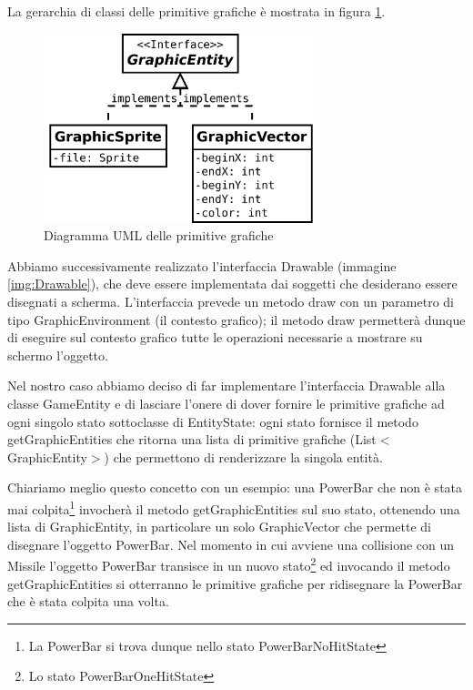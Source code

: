 \documentclass[a4paper,12pt]{article}
\begin{document}
La gerarchia di classi delle primitive grafiche \`e mostrata in figura \ref{img:GraphicEntity}.

\begin{figure}[h]
\centering
\includegraphics[width=8cm]{GraphicEntity.pdf}
\caption{Diagramma UML delle primitive grafiche}
\label{img:GraphicEntity}
\end{figure}

Abbiamo successivamente realizzato l'interfaccia \textsf{Drawable} (immagine \ref{img:Drawable}), che deve essere implementata dai soggetti che desiderano essere disegnati a scherma. L'interfaccia prevede un metodo \textsf{draw} con  un parametro di tipo \textsf{GraphicEnvironment} (il contesto grafico); il metodo \textsf{draw} permetter\`a dunque di eseguire sul contesto grafico tutte le operazioni necessarie a mostrare su schermo l'oggetto.

Nel nostro caso abbiamo deciso di far implementare l'interfaccia \textsf{Drawable} alla classe \textsf{GameEntity} e di lasciare l'onere di dover fornire le primitive grafiche ad ogni singolo stato sottoclasse di \textsf{EntityState}: ogni stato fornisce il metodo \textsf{getGraphicEntities} che ritorna una lista di primitive grafiche (\textsf{List}$<$\textsf{GraphicEntity}$>$) che permettono di renderizzare la singola entit\`a.

Chiariamo meglio questo concetto con un esempio: una \textsf{PowerBar} che non \`e stata mai colpita\footnote{La \textsf{PowerBar} si trova dunque nello stato \textsf{PowerBarNoHitState}} invocher\`a il metodo \textsf{getGraphicEntities} sul suo stato, ottenendo una lista di \textsf{GraphicEntity}, in particolare un solo \textsf{GraphicVector} che permette di disegnare l'oggetto \textsf{PowerBar}. Nel momento in cui avviene una collisione con un \textsf{Missile} l'oggetto \textsf{PowerBar} transisce in un nuovo stato\footnote{Lo stato \textsf{PowerBarOneHitState}} ed invocando il metodo \textsf{getGraphicEntities} si otterranno le primitive grafiche per ridisegnare la \textsf{PowerBar} che \`e stata colpita una volta.
\end{document}
